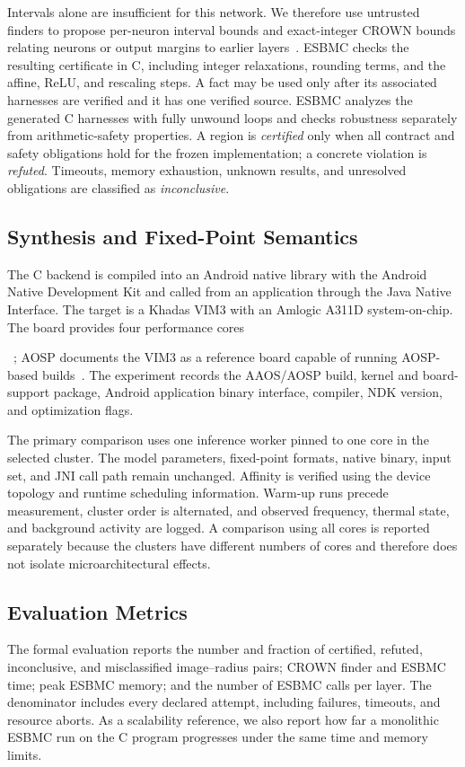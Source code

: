 Intervals alone are insufficient for this network. We therefore use untrusted finders to propose per-neuron interval bounds and exact-integer CROWN bounds relating neurons or output margins to earlier layers~\cite{3327345.3327402}. ESBMC checks the resulting certificate in C, including integer relaxations, rounding terms, and the affine, ReLU, and rescaling steps. A fact may be used only after its associated harnesses are verified and it has one verified source. ESBMC analyzes the generated C harnesses with fully unwound loops and checks robustness separately from arithmetic-safety properties. A region is \emph{certified} only when all contract and safety obligations hold for the frozen implementation; a concrete violation is \emph{refuted}. Timeouts, memory exhaustion, unknown results, and unresolved obligations are classified as \emph{inconclusive}.



\subsection{Synthesis and Fixed-Point Semantics}
\label{sec:aaos}

The C backend is compiled into an Android native library with the Android Native Development Kit and called from an application through the Java Native Interface. The target is a Khadas VIM3 with an Amlogic A311D system-on-chip. The board provides four \Aseven{} performance cores ~\cite{KhadasVIM3}; AOSP documents the VIM3 as a reference board capable of running AOSP-based builds~\cite{AOSPReferenceBoards}. The experiment records the AAOS/AOSP build, kernel and board-support package, Android application binary interface, compiler, NDK version, and optimization flags.

The primary comparison uses one inference worker pinned to one core in the selected cluster. The model parameters, fixed-point formats, native binary, input set, and JNI call path remain unchanged. Affinity is verified using the device topology and runtime scheduling information. Warm-up runs precede measurement, cluster order is alternated, and observed frequency, thermal state, and background activity are logged. A comparison using all cores is reported separately because the clusters have different numbers of cores and therefore does not isolate microarchitectural effects.

\subsection{Evaluation Metrics}
The formal evaluation reports the number and fraction of certified, refuted, inconclusive, and misclassified image--radius pairs; CROWN finder and ESBMC time; peak ESBMC memory; and the number of ESBMC calls per layer. The denominator includes every declared attempt, including failures, timeouts, and resource aborts. As a scalability reference, we also report how far a monolithic ESBMC run on the C program progresses under the same time and memory limits.

